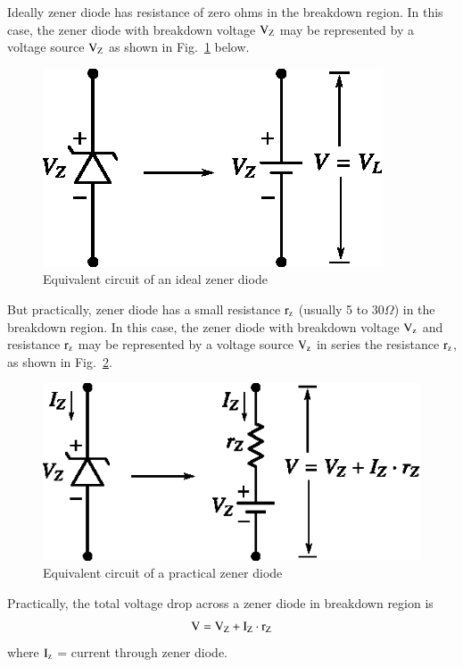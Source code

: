  Ideally zener diode has resistance of zero ohms in the breakdown region. In this case, the zener diode with breakdown voltage $\textrm{V}_{\textrm{Z}}$ may be represented by a voltage source $\textrm{V}_{\textrm{Z}}$ as shown in Fig.~\ref{fig1.52} below.
\begin{figure}[H]
\centering
\includegraphics{chap1/fig1.52.eps}
\caption{Equivalent circuit of an ideal zener diode}\label{fig1.52}
\end{figure}

But practically, zener diode has a small resistance $\textrm{r}_{\textrm{z}}$ (usually 5 to $30\Omega$) in the breakdown region. In this case, the zener diode with breakdown voltage $\textrm{V}_{\textrm{z}}$ and resistance $\textrm{r}_{\textrm{z}}$ may be represented by a voltage source $\textrm{V}_{\textrm{z}}$ in series the resistance $\textrm{r}_{\textrm{z}}$, as shown in Fig.~\ref{fig1.53}.
\begin{figure}[H]
\centering
\includegraphics{chap1/fig1.53.eps}
\caption{Equivalent circuit of a practical zener diode}\label{fig1.53}
\end{figure}

Practically, the total voltage drop across a zener diode in breakdown region is 
\begin{equation}
\textrm{V}=\textrm{V}_{\textrm{Z}}+\textrm{I}_{\textrm{Z}}\cdot \textrm{r}_{\textrm{Z}}
\end{equation}
where $\textrm{I}_{\textrm{z}}$ = current through zener diode.

